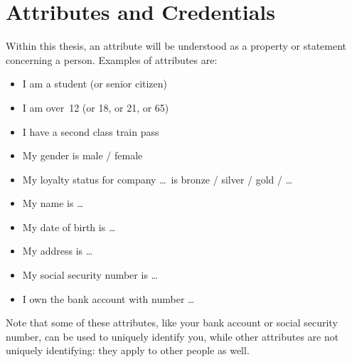 \section{Attributes and Credentials}

Within this thesis, an attribute will be understood as a
property or statement concerning a person. Examples
of attributes are:
\begin{multicols}{2}
\begin{itemize}
  \item I am a \textsf{student} (or \textsf{senior citizen})
  \item I am \textsf{over~12} (or \textsf{18}, or \textsf{21}, or \textsf{65})
  \item I have a \textsf{second class train pass}
  \item My \textsf{gender} is \textsf{male / female}
  \item My \textsf{loyalty status} for company \dots\ is \textsf{bronze / silver / gold / \dots}
  \item My \textsf{name} is \dots
  \item My \textsf{date of birth} is \dots
  \item My \textsf{address} is \dots
  \item My \textsf{social security number} is \dots
  \item I own the \textsf{bank account} with number \dots
\end{itemize}
\end{multicols}

Note that some of these attributes, like your bank account or social security
number, can be used to uniquely identify you, while other attributes are not
uniquely identifying: they apply to other people as well.

